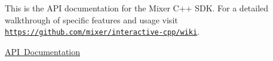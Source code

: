 This is the A\+PI documentation for the Mixer C++ S\+DK. For a detailed walkthrough of specific features and usage visit \href{https://github.com/mixer/interactive-cpp/wiki}{\tt https\+://github.\+com/mixer/interactive-\/cpp/wiki}.

\mbox{\hyperlink{group___interactivity}{A\+PI Documentation}} 